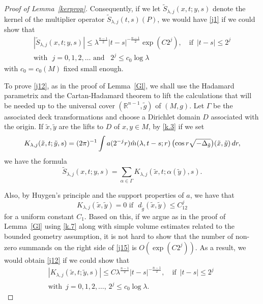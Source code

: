 \documentclass[10pt]{amsart}
\newcommand{\la}{\lambda}
\newcommand{\1}{{\bf 1}}
\begin{document}
\begin{proof}[Proof of Lemma~\ref{kerprop}]
Consequently, if we let  $  \tilde S_{\la,j}(x,t;y,s)$ denote
the kernel of the multiplier operator $\tilde S_{\la,j}(t,s)(P) $,
we would have \eqref{j1} if we could show that
\begin{multline}\label{j12}
|\tilde S_{\la,j}(x,t;y,s)|\le \la^{\frac{n-1}2}|t-s|^{-\frac{n-1}2} \exp(C2^j), \quad \text{if } \, |t-s|\le 2^j
\\
\text{with } \, \, j=0,1,2,\dots \, \, \text{and } \, \,  \, 2^j \le c_0\log\la
\end{multline}
with $c_0=c_0(M)$ fixed small enough.




To prove \eqref{j12}, as in the proof of Lemma~\ref{Gl}, we shall use the 
Hadamard parametrix and the 
Cartan-Hadamard theorem to lift the 
calculations that will be needed up to the
universal cover $({\mathbb R}^{n-1},\tilde g)$
of $(M,g)$. Let $\Gamma$ be the associated
deck transformations and choose a Dirichlet domain $D$ associated with the origin.
If $\tilde x,\tilde y$ are the lifts to $D$ of $x,y\in M$,
by \eqref{k.3} if we set 
\begin{equation}\label{j14}
K_{\la,j}(\tilde x,t;\tilde y,s)=
(2\pi)^{-1}\int a(2^{-j}r)\Hat m(\la,t-s;r)
\, \bigl( \cos r\sqrt{-\Delta_{\tilde g}}\bigr)(\tilde x,
\tilde y) \, dr,
\end{equation}
we have the formula
\begin{equation}\label{j15}
\tilde S_{\la,j}(x,t;y,s)= 
\sum_{\alpha \in \Gamma}
K_{\la,j} (\tilde x,t; \alpha(\tilde y),s).
\end{equation}






Also, by Huygen's principle and the support properties
of $a$, we have that
\begin{equation}\label{j18}
 K_{\la,j}(\tilde x,\tilde y)=0 \, \, \text{if } \, \, 
d_{\tilde g}(\tilde x,\tilde y)\le C_12^j
\end{equation}
for a uniform constant $C_1$.  Based on this, if we argue as in the proof of Lemma~\ref{Gl} using \eqref{k.7} along with simple volume estimates related to the bounded geometry assumption, it is not hard to show that 
 the number
of non-zero summands on the right side of  \eqref{j15} is $O(\exp(C2^j))$.  As a result, we would obtain \eqref{j12} if we could show that
\begin{multline}\label{j20}
|K_{\la,j}(\tilde x,t;\tilde y,s)|\le C\la^{\frac{n-1}2}|t-s|^{-\tfrac{n-1}2},  \quad \text{if } \, |t-s|\le 2^j \, \, \\ \text{with}\,\,\,j=0,1,2,\dots, \, 2^j\le  c_0\log\la.
\end{multline}







\end{proof}
\end{document}
